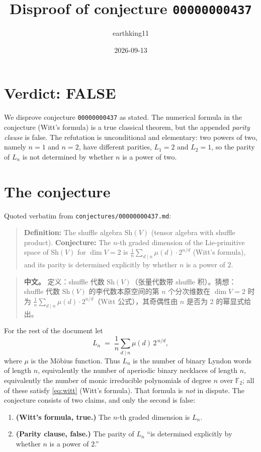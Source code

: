 \documentclass[11pt]{article}
\title{Disproof of conjecture \texttt{00000000437}}
\author{earthking11}
\date{2026-09-13}
\theoremstyle{definition}
\theoremstyle{remark}
\newcommand{\Sh}{\mathrm{Sh}}
\begin{document}
\maketitle

\section*{Verdict: FALSE}

We disprove conjecture \texttt{00000000437} as stated. The numerical formula in
the conjecture (Witt's formula) is a true classical theorem, but the appended
\emph{parity clause} is false. The refutation is unconditional and elementary:
two powers of two, namely $n = 1$ and $n = 2$, have different parities,
$L_1 = 2$ and $L_2 = 1$, so the parity of $L_n$ is not determined by whether
$n$ is a power of two.

\section{The conjecture}

Quoted verbatim from \texttt{conjectures/00000000437.md}:

\begin{quote}
\textbf{Definition:} The shuffle algebra $\Sh(V)$ (tensor algebra with shuffle
product). \textbf{Conjecture:} The $n$-th graded dimension of the
Lie-primitive space of $\Sh(V)$ for $\dim V = 2$ is
$\frac1n\sum_{d\mid n}\mu(d)\cdot 2^{n/d}$ (Witt's formula), and its parity is
determined explicitly by whether $n$ is a power of $2$.
\end{quote}

\begin{quote}
\textbf{中文。} 定义：shuffle 代数 $\Sh(V)$（张量代数带 shuffle 积）。猜想：
shuffle 代数 $\Sh(V)$ 的李代数本原空间的第 $n$ 个分次维数在 $\dim V = 2$
时为 $\frac1n\sum_{d\mid n}\mu(d)\cdot 2^{n/d}$（Witt 公式），其奇偶性由
$n$ 是否为 $2$ 的幂显式给出。
\end{quote}

For the rest of the document let
\begin{equation}\label{eq:witt}
  L_n \;=\; \frac1n \sum_{d\mid n} \mu(d)\, 2^{\,n/d},
\end{equation}
where $\mu$ is the Möbius function. Thus $L_n$ is the number of binary Lyndon
words of length $n$, equivalently the number of aperiodic binary necklaces of
length $n$, equivalently the number of monic irreducible polynomials of degree
$n$ over $\mathbb{F}_2$; all of these satisfy \eqref{eq:witt} (Witt's formula).
That formula is \emph{not} in dispute. The conjecture consists of two claims,
and only the second is false:
\begin{enumerate}
\item \textbf{(Witt's formula, true.)} The $n$-th graded dimension is $L_n$.
\item \textbf{(Parity clause, false.)} The parity of $L_n$ ``is determined
explicitly by whether $n$ is a power of $2$.''
\end{enumerate}
\end{document}
